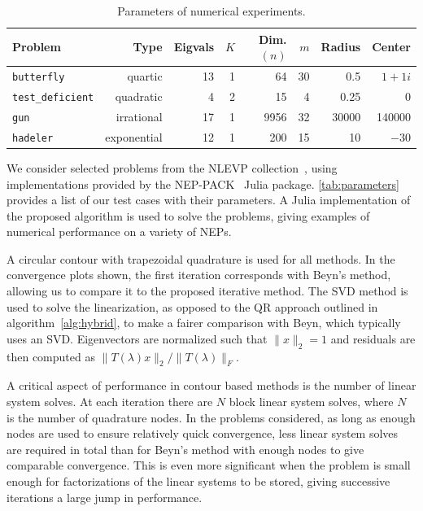 \documentclass[onefignum,onetabnum]{siamart190516}
\newcommand{\norm}[1]{\lVert #1 \rVert}
\begin{document}
\begin{table}[htbp]
	\begin{center}
	\footnotesize
	\caption{Parameters of numerical experiments.}\label{tab:parameters}
	\begin{tabular}{lrrrrrrr}
		\toprule
		Problem & Type & Eigvals & \(K\) & Dim. \( (n) \) & \( m \) & Radius & Center \\
		\midrule
		\verb$butterfly$      & quartic     & 13 & 1 & 64   & 30 &   0.5 & \( 1+1i \) \\
		\verb$test_deficient$ & quadratic   & 4  & 2 & 15   & 4  &  0.25 & 0  \\
		\verb$gun$            & irrational  & 17 & 1 & 9956 & 32 & 30000 & 140000  \\
		\verb$hadeler$        & exponential & 12 & 1 & 200  & 15 &    10 & \(-30\)  \\
		\bottomrule
	\end{tabular}
	\end{center}
\end{table}

We consider selected problems from the NLEVP collection~\cite{betcke2013}, using implementations provided by the NEP-PACK~\cite{jarlebring2018} Julia package. \autoref{tab:parameters} provides a list of our test cases with their parameters.
A Julia implementation of the proposed algorithm is used to solve the problems, giving examples of numerical performance on a variety of NEPs.

A circular contour with trapezoidal quadrature is used for all methods.
In the convergence plots shown, the first iteration corresponds with Beyn's method, allowing us to compare it to the proposed iterative method.
The SVD method is used to solve the linearization, as opposed to the QR approach outlined in algorithm~\ref{alg:hybrid}, to make a fairer comparison with Beyn, which typically uses an SVD.
Eigenvectors are normalized such that \(\norm{x}_2 = 1\) and residuals are then computed as \(\norm{T(\lambda)x}_2/\norm{T(\lambda)}_F\).

A critical aspect of performance in contour based methods is the number of linear system solves.
At each iteration there are \( N \) block linear system solves, where \( N \) is the number of quadrature nodes.
In the problems considered, as long as enough nodes are used to ensure relatively quick convergence, less linear system solves are required in total than for Beyn's method with enough nodes to give comparable convergence.
This is even more significant when the problem is small enough for factorizations of the linear systems to be stored, giving successive iterations a large jump in performance.
\end{document}

